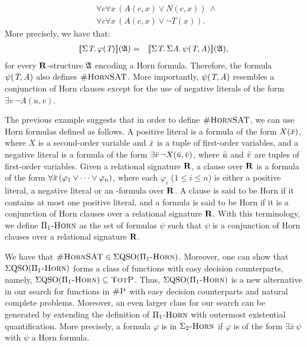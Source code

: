 \begin{example}
\begin{align*}
&\forall c \forall x \, (\textit{A}(c,x) \vee \textit{N}(c,x)) \ \wedge\\
&\forall c \forall x \, (\textit{A}(c,x) \vee \neg\textit{T}(x)).
\end{align*}
More precisely, we have that:
\begin{eqnarray*}
{\llbracket{}{\Sigma{\textit{T}}.\, \varphi(\textit{T})}\rrbracket}(\mathfrak{A}) &=& {\llbracket{}{\Sigma{\textit{T}}.\, \Sigma{\textit{A}}.\, \psi(\textit{T},\textit{A})}\rrbracket}(\mathfrak{A}),
\end{eqnarray*}
 for every $\mathbf{R}$-structure $\mathfrak{A}$ encoding a Horn formula. Therefore, the formula $\psi(\textit{T},\textit{A})$ also defines $\textsc{\#HornSAT}$. More importantly, $\psi(\textit{T},\textit{A})$ resembles a conjunction of Horn clauses except for the use of negative literals of the form $\exists v \, \neg \textit{A}(u,v)$. 
\end{example}
The previous example suggests that in order to define $\textsc{\#HornSAT}$, we can use Horn formulas defined as follows. 
A positive literal is a formula of the form $X(\bar{x})$, where $X$ is a second-order variable and $\bar{x}$ is a tuple of first-order variables, and a negative literal is a formula of the form $\exists \bar{v} \, \neg X(\bar{u},\bar{v})$, where $\bar{u}$ and $\bar{v}$ are tuples of first-order variables. Given a relational signature $\mathbf{R}$, a clause over $\mathbf{R}$ is a formula of the form $\forall \bar{x} \, (\varphi_1 \vee \cdots \vee \varphi_n)$, 
where each $\varphi_i$ ($1 \leq i \leq n$) is either a positive literal, a negative literal or an \fo-formula over $\mathbf{R}$.  A clause is said to be Horn if it contains at most one positive literal, and a formula is said to be Horn if it is a conjunction of Horn clauses over a relational signature $\mathbf{R}$. With this terminology, we define $\Pi_1\textsc{-Horn}$ as the set of formulas $\psi$ such that $\psi$ is a conjunction of Horn clauses over a relational signature $\mathbf{R}$. 

We have that $\textsc{\#HornSAT} \in \Sigma{\rm QSO}(\Pi_1\textsc{-Horn})$. Moreover, one can show that $\Sigma{\rm QSO}(\Pi_1\textsc{-Horn})$ forms a class of functions with easy decision counterparts, namely, $\Sigma{\rm QSO}(\Pi_1\textsc{-Horn}) \subseteq \text{\sc TotP}$.
Thus, $\Sigma{\rm QSO}(\Pi_1\textsc{-Horn})$ is a new alternative in our search for functions in $\text{\sc \#P}$ with easy decision counterparts and natural complete problems. Moreover, an even larger class for our search can be generated by extending the definition of $\Pi_1\textsc{-Horn}$ with outermost existential quantification. More precisely, a formula $\varphi$ is in $\Sigma_2\textsc{-Horn}$ if $\varphi$ is of the form $\exists \bar x \, \psi$ with $\psi$ a Horn formula. 


